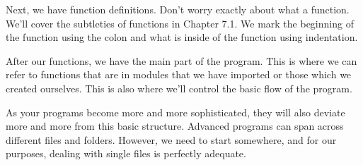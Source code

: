Next, we have function definitions. Don't worry exactly about what a function. We'll cover the subtleties of functions in Chapter 7.1. We mark the beginning of the function using the colon and what is inside of the function using indentation.\par
After our functions, we have the main part of the program. This is where we can refer to functions that are in modules that we have imported or those which we created ourselves. This is also where we'll control the basic flow of the program.\par
As your programs become more and more sophisticated, they will also deviate more and more from this basic structure. Advanced programs can span across different files and folders. However, we need to start somewhere, and for our purposes, dealing with single files is perfectly adequate.\par
